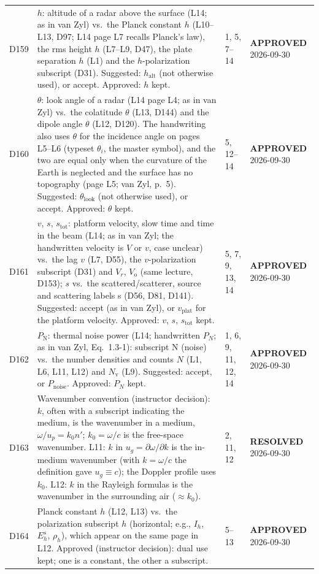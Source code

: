 \documentclass[11pt, oneside]{article}
\newcommand{\approved}{\textbf{APPROVED}}
\newcommand{\resolved}{\textbf{RESOLVED}}
\begin{document}
\begin{longtable}{l >{\raggedright\arraybackslash}p{} l l}
D159 & $h$: altitude of a radar above the surface (L14; as in van Zyl) vs.\ the Planck constant $h$ (L10--L13, D97; L14 page L7 recalls Planck's law), the rms height $h$ (L7--L9, D47), the plate separation $h$ (L1) and the $h$-polarization subscript (D31). Suggested: $h_\mathrm{alt}$ (not otherwise used), or accept. Approved: $h$ kept. & 1, 5, 7--14 & \approved{} 2026-09-30 \\
D160 & $\theta$: look angle of a radar (L14 page L4; as in van Zyl) vs.\ the colatitude $\theta$ (L13, D144) and the dipole angle $\theta$ (L12, D120). The handwriting also uses $\theta$ for the incidence angle on pages L5--L6 (typeset $\theta_i$, the master symbol), and the two are equal only when the curvature of the Earth is neglected and the surface has no topography (page L5; van Zyl, p.~5). Suggested: $\theta_\mathrm{look}$ (not otherwise used), or accept. Approved: $\theta$ kept. & 5, 12--14 & \approved{} 2026-09-30 \\
D161 & $v$, $s$, $s_\mathrm{tot}$: platform velocity, slow time and time in the beam (L14; as in van Zyl; the handwritten velocity is $V$ or $v$, case unclear) vs.\ the lag $v$ (L7, D55), the $v$-polarization subscript (D31) and $V_r$, $V_\mathrm{o}$ (same lecture, D153); $s$ vs.\ the scattered/scatterer, source and scattering labels s (D56, D81, D141). Suggested: accept (as in van Zyl), or $v_\mathrm{plat}$ for the platform velocity. Approved: $v$, $s$, $s_\mathrm{tot}$ kept. & 5, 7, 9, 13, 14 & \approved{} 2026-09-30 \\
D162 & $P_\mathrm{N}$: thermal noise power (L14; handwritten $P_N$; as in van Zyl, Eq.~1.3-1): subscript N (noise) vs.\ the number densities and counts $N$ (L1, L6, L11, L12) and $N_\mathrm{v}$ (L9). Suggested: accept, or $P_\mathrm{noise}$. Approved: $P_N$ kept. & 1, 6, 9, 11, 12, 14 & \approved{} 2026-09-30 \\
D163 & Wavenumber convention (instructor decision): $k$, often with a subscript indicating the medium, is the wavenumber in a medium, $\omega/u_p = k_0n'$; $k_0 = \omega/c$ is the free-space wavenumber. L11: $k$ in $u_g = \partial\omega/\partial k$ is the in-medium wavenumber (with $k = \omega/c$ the definition gave $u_g \equiv c$); the Doppler profile uses $k_0$. L12: $k$ in the Rayleigh formulas is the wavenumber in the surrounding air ($\approx k_0$). & 2, 11, 12 & \resolved{} 2026-09-30 \\
D164 & Planck constant $h$ (L12, L13) vs.\ the polarization subscript $h$ (horizontal; e.g., $I_h$, $E^s_h$, $\rho_h$), which appear on the same page in L12. Approved (instructor decision): dual use kept; one is a constant, the other a subscript. & 5--13 & \approved{} 2026-09-30 \\

\end{longtable}
\end{document}
